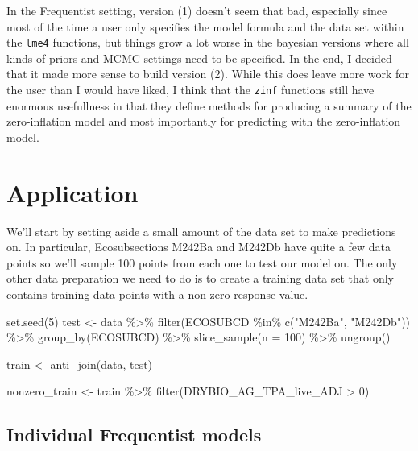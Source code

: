 \documentclass[12pt,twoside]{reedthesis}
\newenvironment{Shaded}{\begin{snugshade}}{\end{snugshade}}
\newcommand{\AttributeTok}[1]{\textcolor[rgb]{0.77,0.63,0.00}{#1}}
\newcommand{\DecValTok}[1]{\textcolor[rgb]{0.00,0.00,0.81}{#1}}
\newcommand{\FunctionTok}[1]{\textcolor[rgb]{0.00,0.00,0.00}{#1}}
\newcommand{\NormalTok}[1]{#1}
\newcommand{\OtherTok}[1]{\textcolor[rgb]{0.56,0.35,0.01}{#1}}
\newcommand{\SpecialCharTok}[1]{\textcolor[rgb]{0.00,0.00,0.00}{#1}}
\newcommand{\StringTok}[1]{\textcolor[rgb]{0.31,0.60,0.02}{#1}}
\begin{document}
In the Frequentist setting, version (1) doesn't seem that bad, especially since most of the time a user only specifies the model formula and the data set within the \texttt{lme4} functions, but things grow a lot worse in the bayesian versions where all kinds of priors and MCMC settings need to be specified. In the end, I decided that it made more sense to build version (2). While this does leave more work for the user than I would have liked, I think that the \texttt{zinf} functions still have enormous usefullness in that they define methods for producing a summary of the zero-inflation model and most importantly for predicting with the zero-inflation model.

\hypertarget{application}{%
\section{Application}\label{application}}

We'll start by setting aside a small amount of the data set to make predictions on. In particular, Ecosubsections M242Ba and M242Db have quite a few data points so we'll sample 100 points from each one to test our model on. The only other data preparation we need to do is to create a training data set that only contains training data points with a non-zero response value.
\begin{Shaded}
\begin{Highlighting}[]
\FunctionTok{set.seed}\NormalTok{(}\DecValTok{5}\NormalTok{)}
\NormalTok{test }\OtherTok{\textless{}{-}}\NormalTok{ data }\SpecialCharTok{\%\textgreater{}\%} 
  \FunctionTok{filter}\NormalTok{(ECOSUBCD }\SpecialCharTok{\%in\%} \FunctionTok{c}\NormalTok{(}\StringTok{"M242Ba"}\NormalTok{, }\StringTok{"M242Db"}\NormalTok{)) }\SpecialCharTok{\%\textgreater{}\%} 
  \FunctionTok{group\_by}\NormalTok{(ECOSUBCD) }\SpecialCharTok{\%\textgreater{}\%} 
  \FunctionTok{slice\_sample}\NormalTok{(}\AttributeTok{n =} \DecValTok{100}\NormalTok{) }\SpecialCharTok{\%\textgreater{}\%} 
  \FunctionTok{ungroup}\NormalTok{()}

\NormalTok{train }\OtherTok{\textless{}{-}} \FunctionTok{anti\_join}\NormalTok{(data, test)}

\NormalTok{nonzero\_train }\OtherTok{\textless{}{-}}\NormalTok{ train }\SpecialCharTok{\%\textgreater{}\%} 
  \FunctionTok{filter}\NormalTok{(DRYBIO\_AG\_TPA\_live\_ADJ }\SpecialCharTok{\textgreater{}} \DecValTok{0}\NormalTok{)}
\end{Highlighting}
\end{Shaded}
\hypertarget{individual-frequentist-models}{%
\subsection{Individual Frequentist models}\label{individual-frequentist-models}}
\end{document}
